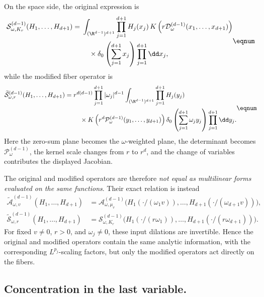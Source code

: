 On the space side, the original expression is
\[
\begin{aligned}
  \mathcal S_{\omega,K_r}^{(d-1)}
  (H_1,\ldots,H_{d+1})
  ={}&\int_{(\R^{d-1})^{d+1}}
  \prod_{j=1}^{d+1}H_j(x_j)\,
  K\left(
    r\mathcal D_\omega^{(d-1)}
    (x_1,\ldots,x_{d+1})
  \right)\\
  &\quad\times
  \delta_0\left(\sum_{j=1}^{d+1}x_j\right)
  \prod_{j=1}^{d+1}\dd x_j,
\end{aligned}
\eqnum \label{eq:original-affine-space-form}
\]
while the modified fiber operator is
\[
\begin{aligned}
  \widetilde{\mathcal S}_{\omega,r}^{(d-1)}
  (H_1,\ldots,H_{d+1})
  ={}&r^{d(d-1)}
  \prod_{j=1}^{d+1}|\omega_j|^{d-1}
  \int_{(\R^{d-1})^{d+1}}\prod_{j=1}^{d+1}H_j(y_j)\\
  &\quad\times
  K\left(
    r^d\mathcal P_\omega^{(d-1)}
    (y_1,\ldots,y_{d+1})
  \right)
  \delta_0\left(\sum_{j=1}^{d+1}\omega_jy_j\right)
  \prod_{j=1}^{d+1}\dd y_j.
\end{aligned}
\eqnum \label{eq:modified-affine-space-form}
\]
Here the zero-sum plane becomes the \(\omega\)-weighted plane, the
determinant becomes \(\mathcal P_\omega^{(d-1)}\), the kernel scale changes
from \(r\) to \(r^d\), and the change of variables contributes the
displayed Jacobian.

The original and modified operators are therefore \emph{not equal as
multilinear forms evaluated on the same functions}.  Their exact relation
is instead
\[
\begin{aligned}
  \widetilde{\mathcal A}_{\omega,v}^{(d-1)}(H_1,\ldots,H_{d+1})
  &=
  \mathcal A_{\omega,\mu_v}^{(d-1)}
  \bigl(H_1(\cdot/(\omega_1v)),\ldots,
        H_{d+1}(\cdot/(\omega_{d+1}v))\bigr),\\
  \widetilde{\mathcal S}_{\omega,r}^{(d-1)}(H_1,\ldots,H_{d+1})
  &=
  \mathcal S_{\omega,K_r}^{(d-1)}
  \bigl(H_1(\cdot/(r\omega_1)),\ldots,
        H_{d+1}(\cdot/(r\omega_{d+1}))\bigr).
\end{aligned}
\]
For fixed \(v\ne0\), \(r>0\), and \(\omega_j\ne0\), these input dilations
are invertible.  Hence the original and modified operators contain the
same analytic information, with the corresponding \(L^{p_j}\)-scaling
factors, but only the modified operators act directly on the fibers.

\subsection{Concentration in the last variable.}

